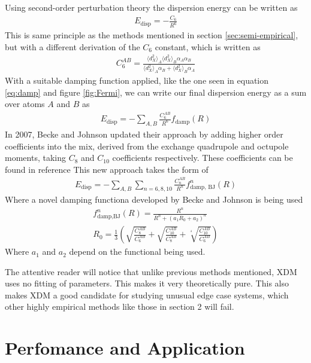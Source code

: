 \documentclass[10pt,a4paper,twocolumn,twoside]{extarticle}
\begin{document}
	Using second-order perturbation theory\cite{XDM-dipole} the dispersion energy can be written as 
	\begin{align}
		E_\text{disp} = -\frac{C_6}{R^6}
	\end{align}
	This is same principle as the methods mentioned in section \ref{sec:semi-empirical}, but with a different derivation of the $C_6$ constant, which is written as
	\begin{align}
		C_6^{AB} = \frac{\langle d_X^2 \rangle_A \langle d_X^2 \rangle_B \alpha_A \alpha_B}{\langle d_X^2 \rangle_A\alpha_B + \langle d_X^2 \rangle_B\alpha_A}
	\end{align} 
	With a suitable damping function applied, like the one seen in equation \ref{eq:damp} and figure \ref{fig:Fermi}, we can write our final dispersion energy as a sum over atoms $A$ and $B$ as 
	\begin{align}
		E_\text{disp} = - \sum_{A,B} \frac{C_6^{AB}}{R^6} f_\text{damp}(R)
	\end{align}
	In 2007, Becke and Johnson updated their approach\cite{XDM-Revisited} by adding higher order coefficients into the mix, derived from the exchange quadrupole and octupole moments, taking $C_8$ and $C_{10}$ coefficients respectively. These coefficients can be found in reference \cite{XDM-Revisited} This new approach takes the form of 
	\begin{align}
		E_\text{disp} = -\sum_{A,B} \sum_{n=6,8,10} \frac{C_n^{AB}}{R^n} f^n_\text{damp, BJ}(R)
	\end{align}
	Where a novel damping functiona developed by Becke and Johnson is being used \cite{BJ-Damp}
	\begin{align}
		\label{eq:BJ-Damp}
		f^n_\text{damp,BJ} (R) = \frac{R^n}{R^n + (a_1 R_0 + a_2)^n}\\
		R_0 = \frac{1}{3} \left( \sqrt{\frac{C_8^{AB}}{C_6^{AB}}} + \sqrt{\frac{C_{10}^{AB}}{C_8^{AB}}}
		+ \sqrt[^4]{\frac{C_{10}^{AB}}{C_6^{AB}}} \right)
	\end{align}
	Where $a_1$ and $a_2$ depend on the functional being used.
	
	The attentive reader will notice that unlike previous methods mentioned, XDM uses no fitting of parameters. This makes it very theoretically pure. This also makes XDM a good candidate for studying unusual edge case systems, which other highly empirical methods like those in section 2 will fail. 

	\section{Perfomance and Application}
\end{document}
